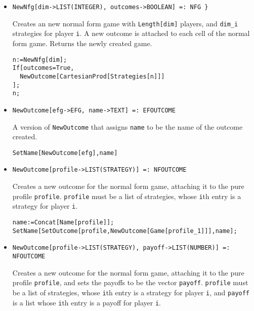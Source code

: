 \begin{itemize}
\item{}
\protect \large \begin{verbatim}
NewNfg[dim->LIST(INTEGER), outcomes->BOOLEAN] =: NFG }
\end{verbatim}\normalsize

\bd 

Creates an new normal form game with \verb+Length[dim]+ players, and
\verb+dim_i+ strategies for player \verb+i+.  A new outcome is
attached to each cell of the normal form game.  Returns the newly
created game.

\begin{verbatim}
n:=NewNfg[dim];
If[outcomes=True,
  NewOutcome[CartesianProd[Strategies[n]]]
];
n;
\end{verbatim} 
\ed

\item{}
\protect \large \begin{verbatim}
NewOutcome[efg->EFG, name->TEXT] =: EFOUTCOME 
\end{verbatim}\normalsize

\bd 
A version of \verb+NewOutcome+ that assigns \verb+name+ to be the name
of the outcome created.  
\begin{verbatim}
SetName[NewOutcome[efg],name]
\end{verbatim} 
\ed

\item{}
\protect \large \begin{verbatim}
NewOutcome[profile->LIST(STRATEGY)] =: NFOUTCOME 
\end{verbatim}\normalsize

\bd 
Creates a new outcome for the normal form game, attaching it to
the pure profile \verb+profile+.  \verb+profile+ must be a list of
strategies, whose \verb+i+th entry is a strategy for player \verb+i+. 


\begin{verbatim}
name:=Concat[Name[profile]];
SetName[SetOutcome[profile,NewOutcome[Game[profile_1]]],name];
\end{verbatim} 
\ed

\item{}
\protect \large \begin{verbatim}
NewOutcome[profile->LIST(STRATEGY), payoff->LIST(NUMBER)] =: NFOUTCOME 
\end{verbatim}\normalsize
 
\bd 
Creates a new outcome for the normal form game, attaching it to
the pure profile \verb+profile+, and sets the payoffs to be the vector
\verb+payoff+.  \verb+profile+ must be a list of strategies, whose
\verb+i+th entry is a strategy for player \verb+i+, and \verb+payoff+
is a list whose \verb+i+th entry is a payoff for player \verb+i+.


\end{itemize}
